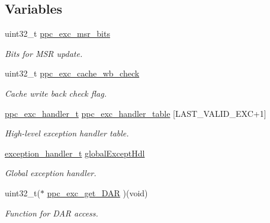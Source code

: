 \subsection*{Variables}
\begin{DoxyCompactItemize}
\item 
uint32\+\_\+t \mbox{\hyperlink{group__ppc__exc_gadfcca9bce17fda755db0ead10c374e60}{ppc\+\_\+exc\+\_\+msr\+\_\+bits}}
\begin{DoxyCompactList}\small\item\em Bits for M\+SR update. \end{DoxyCompactList}\item 
uint32\+\_\+t \mbox{\hyperlink{group__ppc__exc_ga36457bfd67a9428bc8bef14844265c3f}{ppc\+\_\+exc\+\_\+cache\+\_\+wb\+\_\+check}}
\begin{DoxyCompactList}\small\item\em Cache write back check flag. \end{DoxyCompactList}\item 
\mbox{\label{group__ppc__exc_ga2c37b7934cb3cc5aebf97fc0f7dd11ff}} 
\mbox{\hyperlink{group__ppc__exc_ga310d4349fafb7f5d8d5e89d6c6f39ab9}{ppc\+\_\+exc\+\_\+handler\+\_\+t}} \mbox{\hyperlink{group__ppc__exc_ga2c37b7934cb3cc5aebf97fc0f7dd11ff}{ppc\+\_\+exc\+\_\+handler\+\_\+table}} \mbox{[}L\+A\+S\+T\+\_\+\+V\+A\+L\+I\+D\+\_\+\+E\+XC+1\mbox{]}
\begin{DoxyCompactList}\small\item\em High-\/level exception handler table. \end{DoxyCompactList}\item 
\mbox{\label{group__ppc__exc_ga7038587b8e1c62c0691bb0f28c5bd668}} 
\mbox{\hyperlink{group__ppc__exc_gac5e884904b6b113cd137dc1b824b1ff3}{exception\+\_\+handler\+\_\+t}} \mbox{\hyperlink{group__ppc__exc_ga7038587b8e1c62c0691bb0f28c5bd668}{global\+Except\+Hdl}}
\begin{DoxyCompactList}\small\item\em Global exception handler. \end{DoxyCompactList}\item 
uint32\+\_\+t($\ast$ \mbox{\hyperlink{group__ppc__exc_ga1f0a427c9ea16c5cf5a4d9a3f6003541}{ppc\+\_\+exc\+\_\+get\+\_\+\+D\+AR}} )(void)
\begin{DoxyCompactList}\small\item\em Function for D\+AR access. \end{DoxyCompactList}\end{DoxyCompactItemize}


